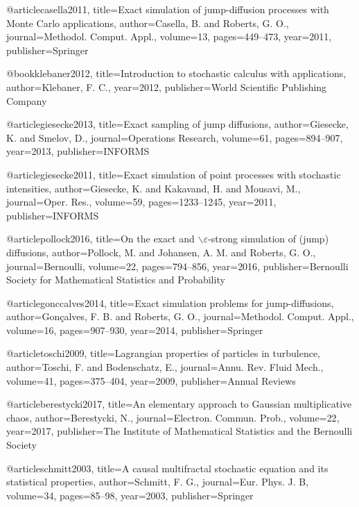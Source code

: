 @article{casella2011,
  title={{Exact simulation of jump-diffusion processes with Monte Carlo applications}},
  author={Casella, B. and Roberts, G. O.},
  journal={Methodol. Comput. Appl.},
  volume={13},
  pages={449--473},
  year={2011},
  publisher={Springer}
}

@book{klebaner2012,
  title={{Introduction to stochastic calculus with applications}},
  author={Klebaner, F. C.},
  year={2012},
  publisher={World Scientific Publishing Company}
}

@article{giesecke2013,
  title={{Exact sampling of jump diffusions}},
  author={Giesecke, K. and Smelov, D.},
  journal={Operations Research},
  volume={61},
  pages={894--907},
  year={2013},
  publisher={INFORMS}
}

@article{giesecke2011,
  title={{Exact simulation of point processes with stochastic intensities}},
  author={Giesecke, K. and Kakavand, H. and Mousavi, M.},
  journal={Oper. Res.},
  volume={59},
  pages={1233--1245},
  year={2011},
  publisher={INFORMS}
}

@article{pollock2016,
  title={On the exact and $\backslash\varepsilon$-strong simulation of (jump) diffusions},
  author={Pollock, M. and Johansen, A. M. and Roberts, G. O.},
  journal={Bernoulli},
  volume={22},
  pages={794--856},
  year={2016},
  publisher={Bernoulli Society for Mathematical Statistics and Probability}
}

@article{gonccalves2014,
  title={{Exact simulation problems for jump-diffusions}},
  author={Gon{\c{c}}alves, F. B. and Roberts, G. O.},
  journal={Methodol. Comput. Appl.},
  volume={16},
  pages={907--930},
  year={2014},
  publisher={Springer}
}

@article{toschi2009,
  title={{Lagrangian properties of particles in turbulence}},
  author={Toschi, F. and Bodenschatz, E.},
  journal={Annu. Rev. Fluid Mech.},
  volume={41},
  pages={375--404},
  year={2009},
  publisher={Annual Reviews}
}

@article{berestycki2017,
  title={{An elementary approach to Gaussian multiplicative chaos}},
  author={Berestycki, N.},
  journal={Electron. Commun. Prob.},
  volume={22},
  year={2017},
  publisher={The Institute of Mathematical Statistics and the Bernoulli Society}
}

@article{schmitt2003,
  title={{A causal multifractal stochastic equation and its statistical properties}},
  author={Schmitt, F. G.},
  journal={Eur. Phys. J. B},
  volume={34},
  pages={85--98},
  year={2003},
  publisher={Springer}
}

